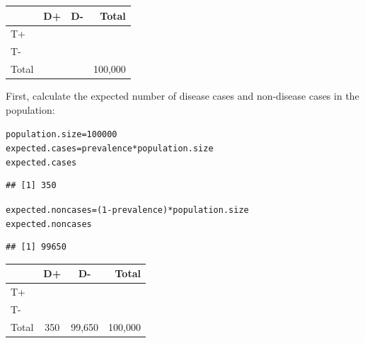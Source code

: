 \documentclass{report}\usepackage[]{graphicx}\usepackage[]{color}
\makeatletter
\newcommand{\hlnum}[1]{\textcolor[rgb]{0.686,0.059,0.569}{#1}}%
\newcommand{\hlopt}[1]{\textcolor[rgb]{0,0,0}{#1}}%
\newcommand{\hlstd}[1]{\textcolor[rgb]{0.345,0.345,0.345}{#1}}%
\newcommand{\hlkwb}[1]{\textcolor[rgb]{0.69,0.353,0.396}{#1}}%
\newenvironment{kframe}{%
 \def\at@end@of@kframe{}%
 \ifinner\ifhmode%
  \def\at@end@of@kframe{\end{minipage}}%
  \begin{minipage}{\columnwidth}%
 \fi\fi%
 \def\FrameCommand##1{\hskip\@totalleftmargin \hskip-\fboxsep
 \colorbox{shadecolor}{##1}\hskip-\fboxsep
     \hskip-\linewidth \hskip-\@totalleftmargin \hskip\columnwidth}%
 \MakeFramed {\advance\hsize-\width
   \@totalleftmargin\z@ \linewidth\hsize
   \@setminipage}}%
 {\par\unskip\endMakeFramed%
 \at@end@of@kframe}
\newenvironment{knitrout}{}{} %
\makeatother
\begin{document}
\begin{center}
\begin{tabular}{|l|c|c|r|}
\hline 
& D+ & D- & Total\\ 
\hline
T+ & & & \\ 
\hline
T- & & & \\ 
\hline 
Total & & & 100,000 \\ 
\hline 
\end{tabular} 
\end{center} 

First, calculate the expected number of disease cases and non-disease cases in the population:
\begin{knitrout}
\color{fgcolor}\begin{kframe}
\begin{alltt}
\hlstd{population.size} \hlkwb{=} \hlnum{100000}
\hlstd{expected.cases} \hlkwb{=} \hlstd{prevalence} \hlopt{*} \hlstd{population.size}
\hlstd{expected.cases}
\end{alltt}
\begin{verbatim}
## [1] 350
\end{verbatim}
\begin{alltt}
\hlstd{expected.noncases} \hlkwb{=} \hlstd{(}\hlnum{1} \hlopt{-} \hlstd{prevalence)} \hlopt{*} \hlstd{population.size}
\hlstd{expected.noncases}
\end{alltt}
\begin{verbatim}
## [1] 99650
\end{verbatim}
\end{kframe}
\end{knitrout}

\begin{center}
\begin{tabular}{|l|c|c|r|}
\hline 
& D+ & D- & Total\\ 
\hline
T+ & & & \\ 
\hline
T- & & & \\ 
\hline 
Total & 350 & 99,650 & 100,000 \\ 
\hline 
\end{tabular} 
\end{center}
\end{document}
